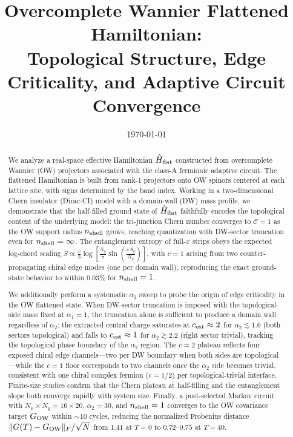 \documentclass[aps,prb,twocolumn,showpacs,floatfix]{revtex4-2}
\newcommand{\nshell}{n_{\rm shell}}
\newcommand{\Cchern}{\mathcal{C}}
\newcommand{\Hflat}{\hat{H}_{\rm flat}}
\newcommand{\GO}{G_{\rm OW}}
\begin{document}
\title{Overcomplete Wannier Flattened Hamiltonian:\\
Topological Structure, Edge Criticality, and Adaptive Circuit Convergence}

\date{\today}

\begin{abstract}
We analyze a real-space effective Hamiltonian $\Hflat$ constructed from
overcomplete Wannier (OW) projectors associated with the class-A fermionic adaptive circuit.
The flattened Hamiltonian is built from rank-1 projectors onto OW spinors centered at each
lattice site, with signs determined by the band index.
Working in a two-dimensional Chern insulator (Dirac-CI) model with a domain-wall (DW)
mass profile, we demonstrate that the half-filled ground state of $\Hflat$
faithfully encodes the topological content of the underlying model:
the tri-junction Chern number converges to $\Cchern = 1$ as the OW support
radius $\nshell$ grows, reaching quantization with DW-sector truncation even
for $\nshell = \infty$.
The entanglement entropy of full-$x$ strips obeys the expected log-chord scaling
$S \propto \frac{c}{3}\log\!\left[\frac{N_y}{\pi}\sin\!\left(\frac{\pi A_y}{N_y}\right)\right]$,
with $c = 1$ arising from two counter-propagating chiral edge modes (one per domain wall),
reproducing the exact ground-state behavior to within $0.03\%$ for $\nshell = 1$.

We additionally perform a systematic $\alpha_2$ sweep to probe the origin of edge
criticality in the OW flattened state.
When DW-sector truncation is imposed with the topological-side mass fixed at $\alpha_1 = 1$,
the truncation alone is sufficient to produce a domain wall regardless of $\alpha_2$:
the extracted central charge saturates at $c_{\rm est} \approx 2$ for $\alpha_2 \lesssim 1.6$
(both sectors topological) and falls to $c_{\rm est} \approx 1$ for $\alpha_2 \gtrsim 2.2$
(right sector trivial), tracking the topological phase boundary of the $\alpha_2$ region.
The $c=2$ plateau reflects four exposed chiral edge channels—two per DW boundary when both
sides are topological—while the $c=1$ floor corresponds to two channels once the $\alpha_2$
side becomes trivial, consistent with one chiral complex fermion ($c = 1/2$) per
topological-trivial interface.
Finite-size studies confirm that the Chern plateau at half-filling and the entanglement
slope both converge rapidly with system size.
Finally, a post-selected Markov circuit with $N_x \times N_y = 16 \times 20$,
$\alpha_2 = 30$, and $\nshell = 1$ converges to the OW covariance target $\GO$
within $\sim 10$ cycles, reducing the normalized Frobenius distance
$\|G(T) - \GO\|_F / \sqrt{N}$ from $1.41$ at $T = 0$ to $0.72$--$0.75$ at $T = 40$.
\end{abstract}
\end{document}
